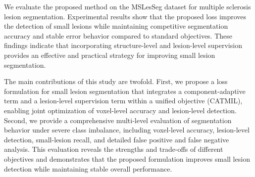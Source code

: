 We evaluate the proposed method on the MSLesSeg dataset for multiple
sclerosis lesion segmentation. Experimental results show that the
proposed loss improves the detection of small lesions while maintaining
competitive segmentation accuracy and stable error behavior compared to
standard objectives. These findings indicate that incorporating
structure-level and lesion-level supervision provides an effective and
practical strategy for improving small lesion segmentation.

The main contributions of this study are twofold. First, we propose a
loss formulation for small lesion segmentation that integrates a
component-adaptive term and a lesion-level supervision term within a
unified objective (CATMIL), enabling joint optimization of voxel-level
accuracy and lesion-level detection. Second, we provide a comprehensive
multi-level evaluation of segmentation behavior under severe class
imbalance, including voxel-level accuracy, lesion-level detection,
small-lesion recall, and detailed false positive and false negative
analysis. This evaluation reveals the strengths and trade-offs of
different objectives and demonstrates that the proposed formulation
improves small lesion detection while maintaining stable overall
performance.